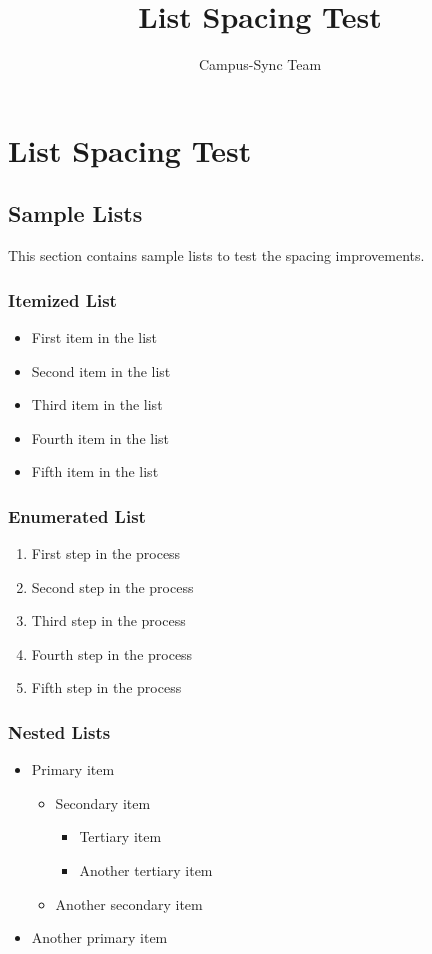 \documentclass[12pt,a4paper]{report}
\title{List Spacing Test}
\author{Campus-Sync Team}
\begin{document}
\chapter{List Spacing Test}

\section{Sample Lists}

This section contains sample lists to test the spacing improvements.

\subsection{Itemized List}

\begin{itemize}
    \item First item in the list
    \item Second item in the list
    \item Third item in the list
    \item Fourth item in the list
    \item Fifth item in the list
\end{itemize}

\subsection{Enumerated List}

\begin{enumerate}
    \item First step in the process
    \item Second step in the process
    \item Third step in the process
    \item Fourth step in the process
    \item Fifth step in the process
\end{enumerate}

\subsection{Nested Lists}

\begin{itemize}
    \item Primary item
    \begin{itemize}
        \item Secondary item
        \begin{itemize}
            \item Tertiary item
            \item Another tertiary item
        \end{itemize}
        \item Another secondary item
    \end{itemize}
    \item Another primary item
\end{itemize}
\end{document}
